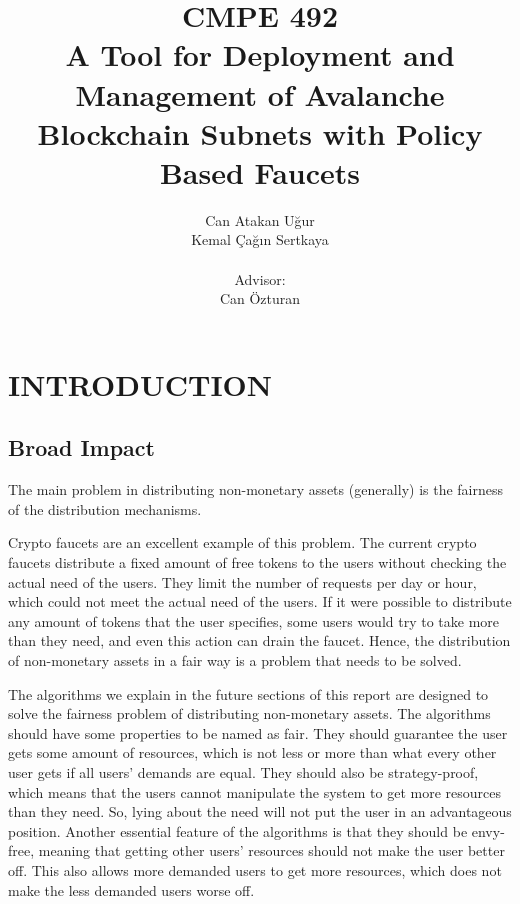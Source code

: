 \documentclass[a4paper,12pt]{report}
\begin{document}
	
\title{\textbf{CMPE 492} \\ A Tool for Deployment and Management of Avalanche Blockchain Subnets with Policy Based Faucets }
\author{
Can Atakan Uğur \\
Kemal Çağın Sertkaya \\ \\
Advisor: \\ 
Can Özturan
}
\date{}
\maketitle{}
\tableofcontents

\chapter{INTRODUCTION}

\section{Broad Impact}

The main problem in distributing non-monetary assets (generally) is the fairness of the distribution mechanisms. 

Crypto faucets are an excellent example of this problem. The current crypto faucets distribute a fixed amount of free tokens to the users without checking the actual need of the users. They limit the number of requests per day or hour, which could not meet the actual need of the users. If it were possible to distribute any amount of tokens that the user specifies, some users would try to take more than they need, and even this action can drain the faucet. Hence, the distribution of non-monetary assets in a fair way is a problem that needs to be solved. 

The algorithms we explain in the future sections of this report are designed to solve the fairness problem of distributing non-monetary assets. The algorithms should have some properties to be named as fair. They should guarantee the user gets some amount of resources, which is not less or more than what every other user gets if all users' demands are equal. They should also be strategy-proof, which means that the users cannot manipulate the system to get more resources than they need. So, lying about the need will not put the user in an advantageous position. Another essential feature of the algorithms is that they should be envy-free, meaning that getting other users' resources should not make the user better off. This also allows more demanded users to get more resources, which does not make the less demanded users worse off. 
\end{document}
